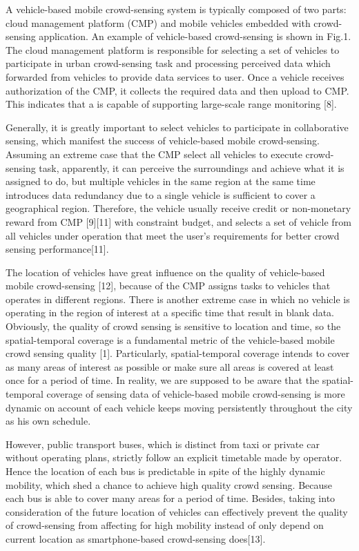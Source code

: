 \documentclass[journal]{IEEEtran}
\begin{document}
A vehicle-based mobile crowd-sensing system is typically composed of two parts: cloud management platform (CMP) and mobile vehicles embedded with crowd-sensing application. An example of vehicle-based crowd-sensing is shown in Fig.1. The cloud management platform is responsible for selecting a set of vehicles to participate in urban crowd-sensing task and processing perceived data which forwarded from vehicles to provide data services to user. Once a vehicle receives authorization of the CMP, it collects the required data and then upload to CMP. This indicates that a is capable of supporting large-scale range monitoring [8].

Generally, it is greatly important to select vehicles to participate in collaborative sensing, which manifest the success of vehicle-based mobile crowd-sensing. Assuming an extreme case that the CMP select all vehicles to execute crowd-sensing task, apparently, it can perceive the surroundings and achieve what it is assigned to do, but multiple vehicles in the same region at the same time introduces data redundancy due to a single vehicle is sufficient to cover a geographical region. Therefore, the vehicle usually receive credit or non-monetary reward from CMP [9][11] with constraint budget, and selects a set of vehicle from all vehicles under operation that meet the user’s requirements for better crowd sensing performance[11].


The location of vehicles have great influence on the quality of vehicle-based mobile crowd-sensing [12], because of the CMP assigns tasks to vehicles that operates in different regions. There is another extreme case in which no vehicle is operating in the region of interest at a specific time that result in blank data. Obviously, the quality of crowd sensing is sensitive to location and time, so the spatial-temporal coverage is a fundamental metric of the vehicle-based mobile crowd sensing quality [1]. Particularly, spatial-temporal coverage intends to cover as many areas of interest as possible or make sure all areas is covered at least once for a period of time. In reality, we are supposed to be aware that the spatial-temporal coverage of sensing data of vehicle-based mobile crowd-sensing is more dynamic on account of each vehicle keeps moving persistently throughout the city as his own schedule.
 
However, public transport buses, which is distinct from taxi or private car without operating plans, strictly follow an explicit timetable made by operator. Hence the location of each bus is predictable in spite of the highly dynamic mobility, which shed a chance to achieve high quality crowd sensing. Because each bus is able to cover many areas for a period of time. Besides, taking into consideration of the future location of vehicles can effectively prevent the quality of crowd-sensing from affecting for high mobility instead of only depend on current location as smartphone-based crowd-sensing does[13].
\end{document}
